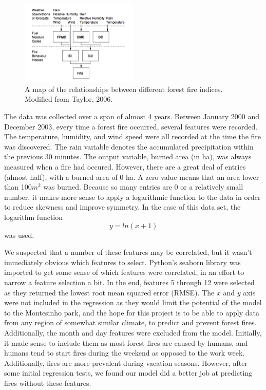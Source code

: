 \documentclass{article}
\begin{document}
\begin{figure}[!ht]
\centering \includegraphics[width=0.5\textwidth]{images/fwi_chart.png}
\caption{A map of the relationships between different forest fire indices. Modified from Taylor, 2006.}
\end{figure}

The data was collected over a span of almost 4 years.  Between January 2000 and December 2003, every time a forest fire occurred, several features were recorded.  The temperature, humidity, and wind speed were all recorded at the time the fire was discovered.  The rain variable denotes the accumulated precipitation within the previous 30 minutes.  The output variable, burned area (in ha), was always measured when a fire had occured.  However, there are a great deal of entries (almost half), with a burned area of 0 ha.  A zero value means that an area lower than 100$m^2$ was burned.  Because so many entries are 0 or a relatively small number, it makes more sense to apply a logarithmic function to the data in order to reduce skewness and improve symmetry.  In the case of this data set, the logarithm function
$$ y = ln(x+1) $$
was used.  

We suspected that a number of these features may be correlated, but it wasn't immediately obvious which features to select.  Python's seaborn library was imported to get some sense of which features were correlated, in an effort to narrow a feature selection a bit.  In the end, features 5 through 12 were selected as they returned the lowest root mean squared error (RMSE).  The $x$ and $y$ axis were not included in the regression as they would limit the potential of the model to the Montesinho park, and the hope for this project is to be able to apply data from any region of somewhat similar climate, to predict and prevent forest fires.  Additionally, the month and day features were excluded from the model.  Initially, it made sense to include them as most forest fires are caused by humans, and humans tend to start fires during the weekend as opposed to the work week.  Additionally, fires are more prevalent during vacation seasons.  However, after some initial regression tests, we found our model did a better job at predicting fires without these features. 
\end{document}
